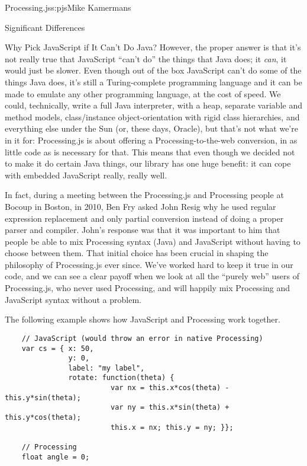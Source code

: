 \begin{aosachapter}{Processing.js}{s:pjs}{Mike Kamermans}
\begin{aosasect1}{Significant Differences}
\begin{aosasect2}{Why Pick JavaScript if It Can't Do Java?}
However, the proper answer is that it's not really true that
JavaScript ``can't do'' the things that Java does; it \emph{can}, it would
just be slower. Even though out of the box JavaScript can't do some of
the things Java does, it's still a Turing-complete programming
language and it can be made to emulate any other programming language,
at the cost of speed. We could, technically, write a full Java
interpreter, with a  heap, separate variable and method models,
class/instance object-orientation with rigid class hierarchies,
and everything else under the Sun (or, these days, Oracle), but that's
not what we're in it for: Processing.js is about offering a
Processing-to-the-web conversion, in as little code as is necessary
for that. This means that even though we decided not to make it do
certain Java things, our library has one huge benefit: it can cope
with embedded JavaScript really, really well.

In fact, during a meeting between the Processing.js and Processing
people at Bocoup in Boston, in 2010, Ben Fry asked John Resig why he
used regular expression replacement and only partial conversion
instead of doing a proper parser and compiler. John's response was
that it was important to him that people be able to mix Processing
syntax (Java) and JavaScript without having to choose between
them. That initial choice has been crucial in shaping the philosophy
of Processing.js ever since. We've worked hard to keep it true in our
code, and we can see a clear payoff when we look at all the ``purely
web'' users of Processing.js, who never used Processing, and will
happily mix Processing and JavaScript syntax without a problem.

\pagebreak 

The following example shows how JavaScript and Processing work together.

\begin{verbatim}
    // JavaScript (would throw an error in native Processing)
    var cs = { x: 50,
               y: 0,
               label: "my label",
               rotate: function(theta) {
                         var nx = this.x*cos(theta) - this.y*sin(theta);
                         var ny = this.x*sin(theta) + this.y*cos(theta);
                         this.x = nx; this.y = ny; }};

    // Processing
    float angle = 0;


\end{verbatim}
\end{aosasect2}
\end{aosasect1}
\end{aosachapter}
